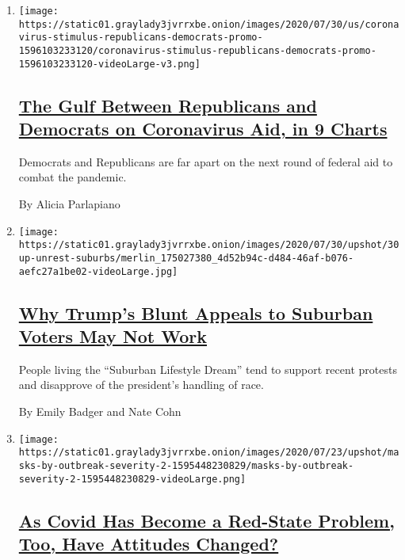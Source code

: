 \begin{enumerate}
\def\labelenumi{\arabic{enumi}.}
\item
  \texttt{[image: https://static01.graylady3jvrrxbe.onion/images/2020/07/30/us/coronavirus-stimulus-republicans-democrats-promo-1596103233120/coronavirus-stimulus-republicans-democrats-promo-1596103233120-videoLarge-v3.png]}

  \hypertarget{the-gulf-between-republicans-and-democrats-on-coronavirus-aid-in-9-charts}{%
  \subsection{\texorpdfstring{\href{/interactive/2020/07/30/upshot/coronavirus-stimulus-bill.html}{The
  Gulf Between Republicans and Democrats on Coronavirus Aid, in 9
  Charts}}{The Gulf Between Republicans and Democrats on Coronavirus Aid, in 9 Charts}}\label{the-gulf-between-republicans-and-democrats-on-coronavirus-aid-in-9-charts}}

  Democrats and Republicans are far apart on the next round of federal
  aid to combat the pandemic.

  By Alicia Parlapiano
\item
  \texttt{[image: https://static01.graylady3jvrrxbe.onion/images/2020/07/30/upshot/30up-unrest-suburbs/merlin\_175027380\_4d52b94c-d484-46af-b076-aefc27a1be02-videoLarge.jpg]}

  \hypertarget{why-trumps-blunt-appeals-to-suburban-voters-may-not-work}{%
  \subsection{\texorpdfstring{\href{/2020/07/30/upshot/trump-suburban-voters.html}{Why
  Trump's Blunt Appeals to Suburban Voters May Not
  Work}}{Why Trump's Blunt Appeals to Suburban Voters May Not Work}}\label{why-trumps-blunt-appeals-to-suburban-voters-may-not-work}}

  People living the ``Suburban Lifestyle Dream'' tend to support recent
  protests and disapprove of the president's handling of race.

  By Emily Badger and Nate Cohn
\item
  \texttt{[image: https://static01.graylady3jvrrxbe.onion/images/2020/07/23/upshot/masks-by-outbreak-severity-2-1595448230829/masks-by-outbreak-severity-2-1595448230829-videoLarge.png]}

  \hypertarget{as-covid-has-become-a-red-state-problem-too-have-attitudes-changed}{%
  \subsection{\texorpdfstring{\href{/2020/07/30/upshot/coronavirus-republican-voting.html}{As
  Covid Has Become a Red-State Problem, Too, Have Attitudes
  Changed?}}{As Covid Has Become a Red-State Problem, Too, Have Attitudes Changed?}}\label{as-covid-has-become-a-red-state-problem-too-have-attitudes-changed}}


\end{enumerate}
